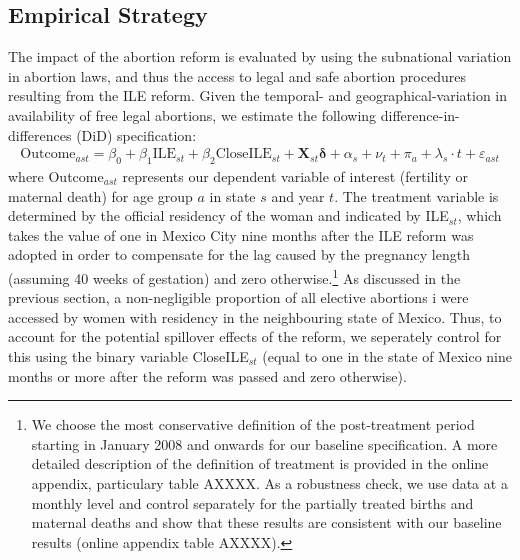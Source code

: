 \documentclass[a4paper, 11pt]{article}
\begin{document}
\begin{spacing}{2}
\section{Empirical Strategy} \label{methodology}
The impact of the abortion reform is evaluated by using the subnational variation in abortion laws, and thus the access to legal and safe abortion procedures resulting from the ILE reform.  Given the temporal- and geographical-variation in availability of free legal abortions, we estimate the following difference-in-differences (DiD) specification:
\begin{eqnarray}\label{eq1}
	\text{Outcome}_{ast}= \beta_0 + \beta_1 \text{ILE}_{st} +\beta_2 \text{CloseILE}_{st}+ \bm{X}_{st}\bm{\delta} +\alpha_{s} + \nu_{t} +\pi_{a}+ \lambda_{s}\cdot t +\varepsilon_{ast}   
\end{eqnarray}
where Outcome$_{ast}$ represents our dependent variable of interest (fertility or maternal death) for age group $a$ in state $s$ and year $t$.  The treatment variable is determined by the official residency of the woman and indicated by ILE$_{st}$, which takes the value of one in Mexico City nine months after the ILE reform was adopted in order to compensate for the lag caused by the pregnancy length (assuming 40 weeks of gestation) and zero otherwise.\footnote{We choose the most conservative definition of the post-treatment period starting in January 2008 and onwards for our baseline specification. A more detailed description of the definition of treatment is provided in the online appendix, particulary table AXXXX.  As a robustness check, we use data at a monthly level and control separately for the partially treated births and maternal deaths and show that these results are consistent with our baseline results (online appendix table AXXXX).} As discussed in the previous section, a non-negligible proportion of all elective abortions i were accessed by women with residency in the neighbouring state of Mexico. Thus, to account for the potential spillover effects of the reform, we seperately control for this using the binary variable CloseILE$_{st}$ (equal to one in the state of Mexico nine months or more after the reform was passed and zero otherwise). 


\end{spacing}
\end{document}
